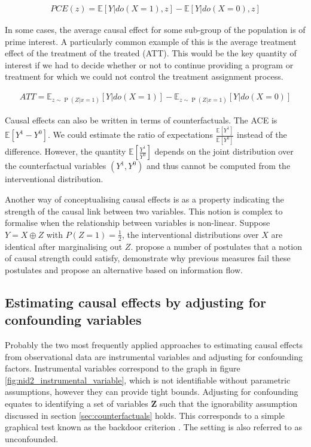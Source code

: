 \documentclass[11pt,a4paper,twoside]{report}
\newcommand{\Esub}[2]{\mathbb E_{#1}\left[{#2}\right]}
\newcommand{\E}[1]{\mathbb E\left[{#1}\right]}
\newcommand{\eqn}[1]{\begin{align}#1\end{align}}
\renewcommand{\P}[1]{\operatorname{P}\left(#1\right)}
\newcommand{\cf}[2]{{#1}^{#2}}
\theoremstyle{plain}
\theoremstyle{definition}
\begin{document}
\eqn{
PCE(z) = \E{Y|do(X=1),z} - \E{Y|do(X=0),z}
}

In some cases, the average causal effect for some sub-group of the population is of prime interest. A particularly common example of this is the average treatment effect of the treatment of the treated (ATT). This would be the key quantity of interest if we had to decide whether or not to continue providing a program or treatment for which we could not control the treatment assignment process. 

\eqn{
ATT = \Esub{z\sim \P{Z|x=1}}{Y|do(X = 1)} - \Esub{z\sim \P{Z|x=1}}{Y|do(X=0)}
}

Causal effects can also be written in terms of counterfactuals. The ACE is $\E{\cf{Y}{1} - \cf{Y}{0}}$. We could estimate the ratio of expectations $\frac{\E{\cf{Y}{1}}}{\E{\cf{Y}{0}}}$ instead of the difference. However, the quantity   $\E{\frac{\cf{Y}{1}}{\cf{Y}{0}}}$ depends on the joint distribution over the counterfactual variables $(\cf{Y}{1},\cf{Y}{0})$ and thus cannot be computed from the interventional distribution. 

Another way of conceptualising causal effects is as a property indicating the strength of the causal link between two variables. This notion is complex to formalise when the relationship between variables is non-linear. Suppose $Y = X \oplus Z$ with $P(Z=1)=\frac{1}{2}$, the interventional distributions over $X$ are identical after marginalising out $Z$. \citet{Janzing2013} propose a number of postulates that a notion of causal strength could satisfy, demonstrate why previous measures fail these postulates and propose an alternative based on information flow. 


\subsection{Estimating causal effects by adjusting for confounding variables}
\label{sec:causal_effect_under_ignorability}
Probably the two most frequently applied approaches to estimating causal effects from observational data are instrumental variables and adjusting for confounding factors. Instrumental variables correspond to the graph in figure \ref{fig:nid2_instrumental_variable}, which is not identifiable without parametric assumptions, however they can provide tight bounds. Adjusting for confounding equates to identifying a set of variables $\boldsymbol{Z}$ such that the ignorability assumption discussed in section \ref{sec:counterfactuals} holds. This corresponds to a simple graphical test known as the backdoor criterion \citep{Pearl2000}. The setting is also referred to as unconfounded. 
\end{document}
